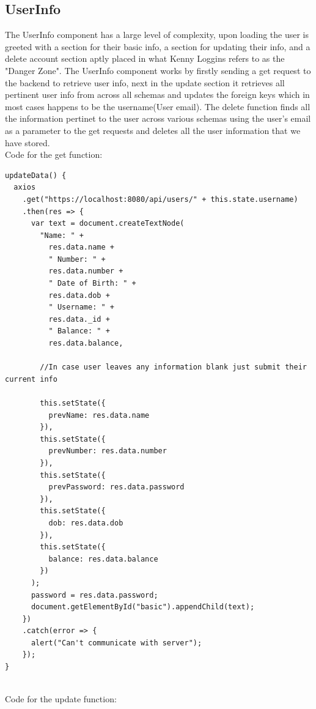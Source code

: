 \subsection{UserInfo}
The UserInfo component has a large level of complexity, upon loading the user is
greeted with a section for their basic info, a section for updating their info,
and a delete account section aptly placed in what Kenny Loggins refers to as the "Danger Zone".
The UserInfo component works by firstly sending a get request to the backend to retrieve user info,
next in the update section it retrieves all pertinent user info from across all schemas and
updates the foreign keys which in most cases happens to be the username(User email).  The delete function
finds all the information pertinet to the user across various schemas using the user's email as
a parameter to the get requests and deletes all the user information that we have stored.
\\
Code for the get function:
\begin{verbatim}
updateData() {
  axios
    .get("https://localhost:8080/api/users/" + this.state.username)
    .then(res => {
      var text = document.createTextNode(
        "Name: " +
          res.data.name +
          " Number: " +
          res.data.number +
          " Date of Birth: " +
          res.data.dob +
          " Username: " +
          res.data._id +
          " Balance: " +
          res.data.balance,

        //In case user leaves any information blank just submit their current info

        this.setState({
          prevName: res.data.name
        }),
        this.setState({
          prevNumber: res.data.number
        }),
        this.setState({
          prevPassword: res.data.password
        }),
        this.setState({
          dob: res.data.dob
        }),
        this.setState({
          balance: res.data.balance
        })
      );
      password = res.data.password;
      document.getElementById("basic").appendChild(text);
    })
    .catch(error => {
      alert("Can't communicate with server");
    });
}
\end{verbatim}
\\
Code for the update function:
